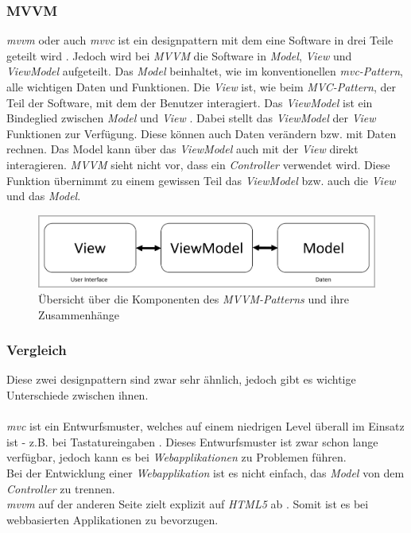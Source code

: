\subsubsection{MVVM}
\textit{\Gls{mvvm}} oder auch \textit{\Gls{mvvc}} ist ein \Gls{designpattern} mit dem eine Software in drei Teile geteilt wird \cite{mvvm_vue}. Jedoch wird bei \textit{MVVM} die Software in \textit{Model}, \textit{View} und \textit{ViewModel} aufgeteilt. 
Das \textit{Model} beinhaltet, wie im konventionellen \textit{\Gls{mvc}-Pattern}, alle wichtigen Daten und Funktionen. 
Die \textit{View} ist, wie beim \textit{MVC-Pattern}, der Teil der Software, mit dem der Benutzer interagiert. 
Das \textit{ViewModel} ist ein Bindeglied zwischen \textit{Model} und \textit{View} \cite{mvvm_vue}. Dabei stellt das \textit{ViewModel} der \textit{View} Funktionen zur Verfügung. Diese können auch Daten verändern bzw. mit Daten rechnen. Das Model kann über das \textit{ViewModel} auch mit der \textit{View} direkt interagieren. 
\textit{MVVM} sieht nicht vor, dass ein \textit{Controller} verwendet wird. Diese Funktion übernimmt zu einem gewissen Teil das \textit{ViewModel} bzw. auch die \textit{View} und das \textit{Model}.
\begin{figure}[H]
	\centering
	\includegraphics[width=0.8\linewidth]{images/rfoster_study/mvvm}
	\caption[Übersicht des \textit{MVVM-Patterns}]{Übersicht über die Komponenten des \textit{MVVM-Patterns} und ihre Zusammenhänge}
	\label{fig:mvvm}
\end{figure}
\subsubsection{Vergleich}
Diese zwei \Gls{designpattern} sind zwar sehr ähnlich, jedoch gibt es wichtige Unterschiede zwischen ihnen.\\\\
\textit{\Gls{mvc}} ist ein Entwurfsmuster, welches auf einem niedrigen Level überall im Einsatz ist - z.B. bei Tastatureingaben \cite{mvc}. Dieses Entwurfsmuster ist zwar schon lange verfügbar, jedoch kann es bei \textit{Webapplikationen} zu Problemen führen.\\
Bei der Entwicklung einer \textit{Webapplikation} ist es nicht einfach, das \textit{Model} von dem \textit{Controller} zu trennen.\\
\textit{\Gls{mvvm}} auf der anderen Seite zielt explizit auf \textit{HTML5} ab \cite{mvvm_vue}. Somit ist es bei webbasierten Applikationen zu bevorzugen.
\newpage
